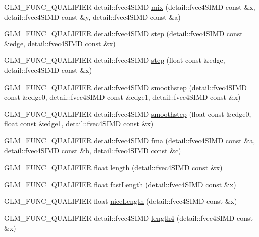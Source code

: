\begin{DoxyCompactItemize}
\item 
G\+L\+M\+\_\+\+F\+U\+N\+C\+\_\+\+Q\+U\+A\+L\+I\+F\+I\+E\+R detail\+::fvec4\+S\+I\+M\+D \hyperlink{namespaceglm_a4b388e53d27196411517929d6ee91867}{mix} (detail\+::fvec4\+S\+I\+M\+D const \&x, detail\+::fvec4\+S\+I\+M\+D const \&y, detail\+::fvec4\+S\+I\+M\+D const \&a)
\item 
G\+L\+M\+\_\+\+F\+U\+N\+C\+\_\+\+Q\+U\+A\+L\+I\+F\+I\+E\+R detail\+::fvec4\+S\+I\+M\+D \hyperlink{namespaceglm_a0af681288eaacb38ded2a597bc7fd214}{step} (detail\+::fvec4\+S\+I\+M\+D const \&edge, detail\+::fvec4\+S\+I\+M\+D const \&x)
\item 
G\+L\+M\+\_\+\+F\+U\+N\+C\+\_\+\+Q\+U\+A\+L\+I\+F\+I\+E\+R detail\+::fvec4\+S\+I\+M\+D \hyperlink{namespaceglm_ac7e3b091e30c01352c8349c656d52a9f}{step} (float const \&edge, detail\+::fvec4\+S\+I\+M\+D const \&x)
\item 
G\+L\+M\+\_\+\+F\+U\+N\+C\+\_\+\+Q\+U\+A\+L\+I\+F\+I\+E\+R detail\+::fvec4\+S\+I\+M\+D \hyperlink{namespaceglm_acaa3fe01372937d4ee7739ad87db0f15}{smoothstep} (detail\+::fvec4\+S\+I\+M\+D const \&edge0, detail\+::fvec4\+S\+I\+M\+D const \&edge1, detail\+::fvec4\+S\+I\+M\+D const \&x)
\item 
G\+L\+M\+\_\+\+F\+U\+N\+C\+\_\+\+Q\+U\+A\+L\+I\+F\+I\+E\+R detail\+::fvec4\+S\+I\+M\+D \hyperlink{namespaceglm_a38415c03c75a84267151b370d866e42e}{smoothstep} (float const \&edge0, float const \&edge1, detail\+::fvec4\+S\+I\+M\+D const \&x)
\item 
G\+L\+M\+\_\+\+F\+U\+N\+C\+\_\+\+Q\+U\+A\+L\+I\+F\+I\+E\+R detail\+::fvec4\+S\+I\+M\+D \hyperlink{namespaceglm_a3dd47df42a32adc14c604bed47633830}{fma} (detail\+::fvec4\+S\+I\+M\+D const \&a, detail\+::fvec4\+S\+I\+M\+D const \&b, detail\+::fvec4\+S\+I\+M\+D const \&c)
\item 
G\+L\+M\+\_\+\+F\+U\+N\+C\+\_\+\+Q\+U\+A\+L\+I\+F\+I\+E\+R float \hyperlink{namespaceglm_a65aff7dc68102a01ec2746d2c0c733c7}{length} (detail\+::fvec4\+S\+I\+M\+D const \&x)
\item 
G\+L\+M\+\_\+\+F\+U\+N\+C\+\_\+\+Q\+U\+A\+L\+I\+F\+I\+E\+R float \hyperlink{namespaceglm_ae8fababc16f402b8e518982eb08284ef}{fast\+Length} (detail\+::fvec4\+S\+I\+M\+D const \&x)
\item 
G\+L\+M\+\_\+\+F\+U\+N\+C\+\_\+\+Q\+U\+A\+L\+I\+F\+I\+E\+R float \hyperlink{namespaceglm_a34a9cfc7cf7fe9b35911cc3013033e61}{nice\+Length} (detail\+::fvec4\+S\+I\+M\+D const \&x)
\item 
G\+L\+M\+\_\+\+F\+U\+N\+C\+\_\+\+Q\+U\+A\+L\+I\+F\+I\+E\+R detail\+::fvec4\+S\+I\+M\+D \hyperlink{namespaceglm_a9de224e4659dd8df0f6cbfe87785ad37}{length4} (detail\+::fvec4\+S\+I\+M\+D const \&x)

\end{DoxyCompactItemize}
